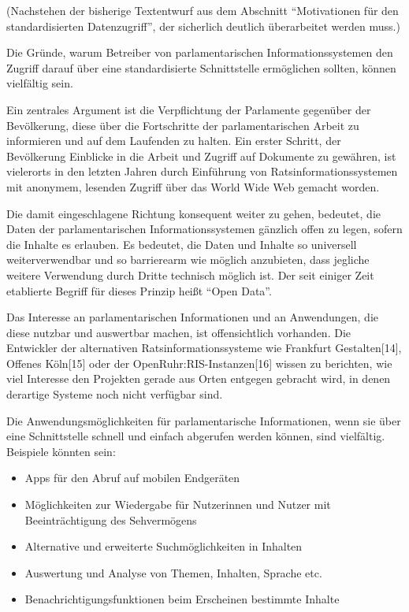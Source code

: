 \documentclass[,a4paper]{article}
\begin{document}
(Nachstehen der bisherige Textentwurf aus dem Abschnitt ``Motivationen
für den standardisierten Datenzugriff'', der sicherlich deutlich
überarbeitet werden muss.)

Die Gründe, warum Betreiber von parlamentarischen Informationssystemen
den Zugriff darauf über eine standardisierte Schnittstelle ermöglichen
sollten, können vielfältig sein.

Ein zentrales Argument ist die Verpflichtung der Parlamente gegenüber
der Bevölkerung, diese über die Fortschritte der parlamentarischen
Arbeit zu informieren und auf dem Laufenden zu halten. Ein erster
Schritt, der Bevölkerung Einblicke in die Arbeit und Zugriff auf
Dokumente zu gewähren, ist vielerorts in den letzten Jahren durch
Einführung von Ratsinformationssystemen mit anonymem, lesenden Zugriff
über das World Wide Web gemacht worden.

Die damit eingeschlagene Richtung konsequent weiter zu gehen, bedeutet,
die Daten der parlamentarischen Informationssystemen gänzlich offen zu
legen, sofern die Inhalte es erlauben. Es bedeutet, die Daten und
Inhalte so universell weiterverwendbar und so barrierearm wie möglich
anzubieten, dass jegliche weitere Verwendung durch Dritte technisch
möglich ist. Der seit einiger Zeit etablierte Begriff für dieses Prinzip
heißt ``Open Data''.

Das Interesse an parlamentarischen Informationen und an Anwendungen, die
diese nutzbar und auswertbar machen, ist offensichtlich vorhanden. Die
Entwickler der alternativen Ratsinformationssysteme wie Frankfurt
Gestalten{[}14{]}, Offenes Köln{[}15{]} oder der
OpenRuhr:RIS-Instanzen{[}16{]} wissen zu berichten, wie viel Interesse
den Projekten gerade aus Orten entgegen gebracht wird, in denen
derartige Systeme noch nicht verfügbar sind.

Die Anwendungsmöglichkeiten für parlamentarische Informationen, wenn sie
über eine Schnittstelle schnell und einfach abgerufen werden können,
sind vielfältig. Beispiele könnten sein:

\begin{itemize}
\itemsep1pt\parskip0pt
\item
  Apps für den Abruf auf mobilen Endgeräten
\item
  Möglichkeiten zur Wiedergabe für Nutzerinnen und Nutzer mit
  Beeinträchtigung des Sehvermögens
\item
  Alternative und erweiterte Suchmöglichkeiten in Inhalten
\item
  Auswertung und Analyse von Themen, Inhalten, Sprache etc.
\item
  Benachrichtigungsfunktionen beim Erscheinen bestimmte Inhalte
\end{itemize}
\end{document}
